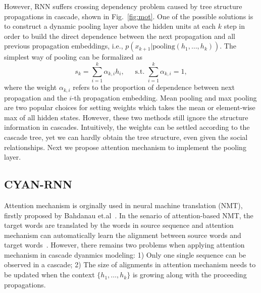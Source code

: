 However, RNN suffers crossing dependency problem caused by tree structure
propagations in cascade, shown in Fig.~\ref{fig:mot}. One of the possible
solutions is to construct a dynamic pooling layer above the hidden
units at each $k$ step in order to build the direct dependence between the
next propagation and all previous propagation embeddings,
i.e., $p(x_{k+1} | \text{pooling}(h_1,\ldots,h_k))$. The simplest way of pooling can
be formalized as
\begin{equation}
\label{eq:pooling_frame}
s_k=\sum_{i=1}^k \alpha_{k,i} h_i \text{,~~~~~s.t.~} \sum_{i=1}^k
\alpha_{k,i}=1,
\end{equation}
where the weight $\alpha_{k,i}$ refers to the proportion of dependence between
next propagation and the $i$-th propagation embedding. Mean pooling and max
pooling are two popular choices for setting weights which takes the mean or element-wise
max of all hidden states. However, these two methods still ignore the structure
information in cascades.
Intuitively, the weights can be settled according to the cascade tree, yet we
can hardly obtain the tree structure, even given the social relationships. Next
we propose attention mechanism to implement the pooling layer. 

\subsection{CYAN-RNN}
Attention mechanism is orginally used in neural machine translation (NMT),
firstly proposed by Bahdanau et.al~\cite{bahdanau2014neural}. In the
senario of attention-based NMT, the target words are translated by the words in
source sequence and attention mechanism can automatically learn the alignment
between source words and target words~\cite{}.
However, there remains two
problems when applying attention mechanism in cascade dyanmics modeling: 1)
Only one single sequence can be observed in a cascade; 2) The size of
alignments in attention mechanism needs to be updated when the context
$\{h_1,\ldots,h_k\}$ is growing along with the proceeding propagations.

